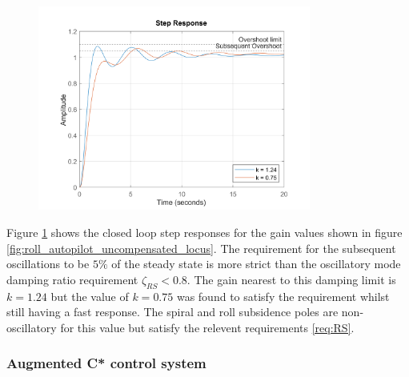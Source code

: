 \documentclass{article}
\begin{document}
\begin{figure}[H]
    \centering
    \includegraphics[width=0.8\textwidth]{figures/roll_autopilot_step_uncompensated.png}
    \caption{}
    \label{fig:roll_autopilot_step_uncompensated}
\end{figure}

Figure \ref{fig:roll_autopilot_step_uncompensated} shows the closed loop step responses for the gain values shown in figure \ref{fig:roll_autopilot_uncompensated_locus}.
The requirement for the subsequent oscillations to be $5 \%$ of the steady state is more strict than the oscillatory mode damping ratio requirement $\zeta_{RS}<0.8$.
The gain nearest to this damping limit is $k=1.24$ but the value of $k=0.75$ was found to satisfy the requirement whilst still having a fast response.
The spiral and roll subsidence poles are non-oscillatory for this value but satisfy the relevent requirements \ref{req:RS}.


\subsubsection{Augmented C* control system}

\end{document}
